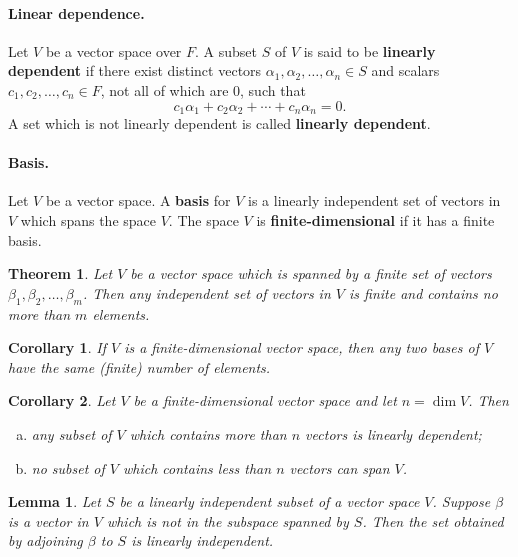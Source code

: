 \documentclass{article}
\newtheorem{theorem}{Theorem}
\newtheorem{corollary}{Corollary}
\newtheorem*{lemma*}{Lemma}
\begin{document}
\paragraph{Linear dependence.} Let $V$ be a vector space over $F$. A subset $S$
of $V$ is said to be \textbf{linearly dependent} if there exist distinct vectors
$\alpha_1, \alpha_2, \ldots, \alpha_n \in S$ and scalars $c_1, c_2, \ldots, c_n
\in F$, not all of which are 0, such that \[
  c_1\alpha_1 + c_2\alpha_2 + \cdots + c_n\alpha_n = 0.
\] A set which is not linearly dependent is called \textbf{linearly dependent}.

\paragraph{Basis.} Let $V$ be a vector space. A \textbf{basis} for $V$ is a
linearly independent set of vectors in $V$ which spans the space $V$. The space
$V$ is \textbf{finite-dimensional} if it has a finite basis.

\begin{theorem}
  Let $V$ be a vector space which is spanned by a finite set of vectors
  $\beta_1, \beta_2, \ldots, \beta_m$. Then any independent set of vectors in
  $V$ is finite and contains no more than $m$ elements.
\end{theorem}

\setcounter{corollary}{0}
\begin{corollary}
  If $V$ is a finite-dimensional vector space, then any two bases of $V$ have
  the same (finite) number of elements.
\end{corollary}

\begin{corollary}
  Let $V$ be a finite-dimensional vector space and let $n = \dim V$. Then
  \begin{enumerate}[(a)]
    \item any subset of $V$ which contains more than $n$ vectors is linearly
      dependent;
    \item no subset of $V$ which contains less than $n$ vectors can span $V$.
  \end{enumerate}
\end{corollary}

\begin{lemma*}
  Let $S$ be a linearly independent subset of a vector space $V$. Suppose
  $\beta$ is a vector in $V$ which is not in the subspace spanned by $S$. Then
  the set obtained by adjoining $\beta$ to $S$ is linearly independent.
\end{lemma*}
\end{document}
